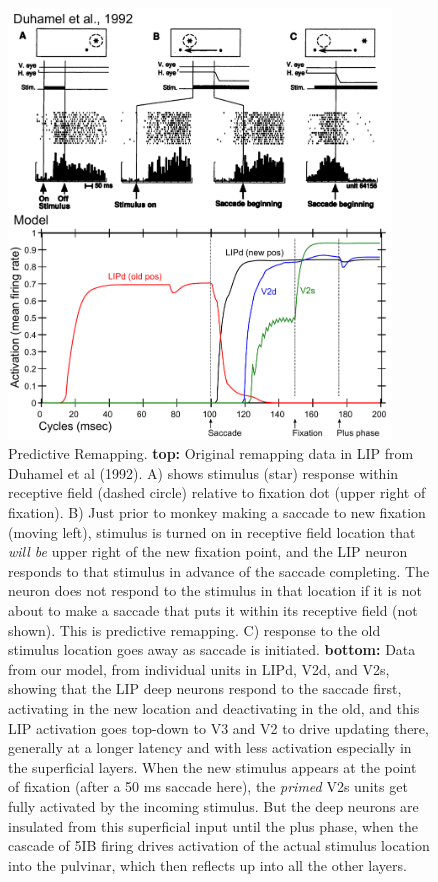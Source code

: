 \documentclass[11pt,twoside]{article}
\newif\myifpdf
\begin{document}
\begin{figure}
  \centering\includegraphics[width=4in]{fig_deepleabra_wwi_pred_remap_untraj_vs_data}
  \caption{\footnotesize Predictive Remapping.  {\bf top:} Original remapping data in LIP from Duhamel et al (1992).  A) shows stimulus (star) response within receptive field (dashed circle) relative to fixation dot (upper right of fixation).  B) Just prior to monkey making a saccade to new fixation (moving left), stimulus is turned on in receptive field location that \emph{will be} upper right of the new fixation point, and the LIP neuron responds to that stimulus in advance of the saccade completing.  The neuron does not respond to the stimulus in that location if it is not about to make a saccade that puts it within its receptive field (not shown).  This is predictive remapping.  C) response to the old stimulus location goes away as saccade is initiated.  {\bf bottom:} Data from our model, from individual units in LIPd, V2d, and V2s, showing that the LIP deep neurons respond to the saccade first, activating in the new location and deactivating in the old, and this LIP activation goes top-down to V3 and V2 to drive updating there, generally at a longer latency and with less activation especially in the superficial layers.  When the new stimulus appears at the point of fixation (after a 50 ms saccade here), the \emph{primed} V2s units get fully activated by the incoming stimulus.  But the deep neurons are insulated from this superficial input until the plus phase, when the cascade of 5IB firing drives activation of the actual stimulus location into the pulvinar, which then reflects up into all the other layers.}
  \label{fig.remap_units}
\end{figure}
\end{document}
